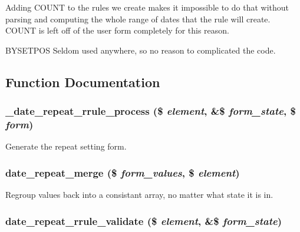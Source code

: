 Adding COUNT to the rules we create makes it impossible to do that without parsing and computing the whole range of dates that the rule will create. COUNT is left off of the user form completely for this reason.

BYSETPOS Seldom used anywhere, so no reason to complicated the code. 

\subsection{Function Documentation}
\hypertarget{date__repeat__form_8inc_ae8a7a65ffe8a8e9438fe223150e44293}{
\subsubsection[{\_\-date\_\-repeat\_\-rrule\_\-process}]{\setlength{\rightskip}{0pt plus 5cm}\_\-date\_\-repeat\_\-rrule\_\-process (\$ {\em element}, \/  \&\$ {\em form\_\-state}, \/  \$ {\em form})}}
\label{date__repeat__form_8inc_ae8a7a65ffe8a8e9438fe223150e44293}
Generate the repeat setting form. \hypertarget{date__repeat__form_8inc_a79c5abcab182e5c6195eb60b7933e927}{
\subsubsection[{date\_\-repeat\_\-merge}]{\setlength{\rightskip}{0pt plus 5cm}date\_\-repeat\_\-merge (\$ {\em form\_\-values}, \/  \$ {\em element})}}
\label{date__repeat__form_8inc_a79c5abcab182e5c6195eb60b7933e927}
Regroup values back into a consistant array, no matter what state it is in. \hypertarget{date__repeat__form_8inc_a72736d70f374c2a39e89c6988b28c724}{
\subsubsection[{date\_\-repeat\_\-rrule\_\-validate}]{\setlength{\rightskip}{0pt plus 5cm}date\_\-repeat\_\-rrule\_\-validate (\$ {\em element}, \/  \&\$ {\em form\_\-state})}}
